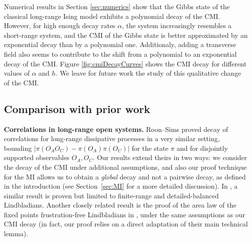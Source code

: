 \documentclass[11pt]{article}
\numberwithin{equation}{section}
\numberwithin{figure}{section}
\numberwithin{table}{section}
\theoremstyle{definition}
\theoremstyle{plain}
\theoremstyle{remark}
\begin{document}
Numerical results in Section \ref{sec:numerics} show that the Gibbs state of the classical long-range Ising model exhibits a polynomial decay of the CMI. However, for high enough decay rates $\alpha$, the system increasingly resembles a short-range system, and the CMI of the Gibbs state is better approximated by an exponential decay than by a polynomial one. Additionaly, adding a transverse field also seems to contribute to the shift from a polynomial to an exponential decay of the CMI. Figure \ref{fig:cmiDecayCurves} shows the CMI decay for different values of $\alpha$ and $h$. We leave for future work the study of this qualitative change of the CMI.


\subsection{Comparison with prior work}\label{sec:comparisonPriorWork}

\textbf{Correlations in long-range open systems.} Roon--Sims \cite{roon_quasi-locality_2024} proved  decay of correlations for long-range dissipative processes in a very similar setting, bounding $|\pi(O_A O_C)-\pi(O_A)\pi(O_C)|$ for the state $\pi$ and for disjointly supported observables $O_A,O_C$. Our results extend theirs in two ways: we consider the decay of the CMI under additional assumptions, and also our proof technique for the MI allows us to obtain a \emph{global} decay and not a pairwise decay, as defined in the introduction (see Section~\ref{sec:MI} for a more detailed discussion). 
In \cite{kastoryano_rapid_2013}, a similar result is proven but limited to finite-range and detailed-balanced Lindbladians. Another closely related result is the proof of the area law of the fixed points frustration-free Lindbladians in \cite{brandao_area_2015}, under the same assumptions as our CMI decay (in fact, our proof relies on a direct adaptation of their main technical lemma).  
\end{document}
